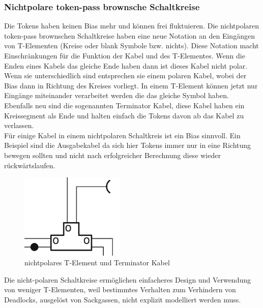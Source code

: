 \documentclass[11pt,a4paper]{article}
\begin{document}

\subsubsection{Nichtpolare token-pass brownsche Schaltkreise}
Die Tokens haben keinen Bias mehr und können frei fluktuieren.
%
Die nichtpolaren token-pass brownschen Schaltkreise haben eine neue Notation
an den Eingängen von T-Elementen (Kreise oder blank Symbole bzw. nichts).
%
Diese Notation macht Einschränkungen für die Funktion
der Kabel und des T-Elementes.
%
Wenn die Enden eines Kabels das gleiche Ende haben dann ist dieses Kabel nicht
polar. 
%
Wenn sie unterschiedlich sind entsprechen sie einem polaren Kabel, wobei 
der Bias dann in Richtung des Kreises vorliegt.
%
In einem T-Element können jetzt nur Eingänge miteinander verarbeitet werden
die das gleiche Symbol haben. \\
%
Ebenfalls neu sind die sogenannten Terminator Kabel, diese Kabel haben ein 
Kreissegment als Ende und halten einfach die Tokens 
davon ab das Kabel zu verlassen. \\
%
Für einige Kabel in einem nichtpolaren Schaltkreis ist ein Bias sinnvoll.
%
Ein Beispiel sind die Ausgabekabel da sich hier Tokens immer nur in eine 
Richtung bewegen sollten und nicht nach erfolgreicher Berechnung diese 
wieder rückwärtslaufen.

\begin{figure}[h]
    \centering
    \includegraphics[width=5cm]{bilder/NonPolarTerminator.png}
    \caption{nichtpolares T-Element und Terminator Kabel}
    \label{fig:T_Element}
\end{figure}

Die nicht-polaren Schaltkreise ermöglichen einfacheres Design und Verwendung
von weniger T-Elementen, weil bestimmtes Verhalten zum Verhindern von
Deadlocks, ausgelöst von Sackgassen, nicht explizit modelliert werden muss.


\end{document}

